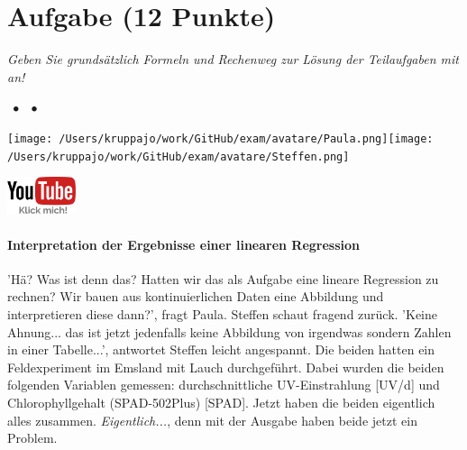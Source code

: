 \documentclass[a4paper, 9pt]{scrartcl}\usepackage[]{graphicx}\usepackage[]{xcolor}
\begin{document}
\section{Aufgabe \hfill (12 Punkte)}

\textit{Geben Sie grundsätzlich Formeln und Rechenweg zur Lösung der Teilaufgaben mit an!} \\[1Ex]
 

 
\ifcollection
\begin{flushright}
\tiny\vspace{-3Ex}
\textbf{\examinhaltstart}
\exammodulestat $\;\bullet$
\exammodulestatbbv $\;\bullet$
\exammodulestatversuch 
\vspace{-4Ex}
\end{flushright}
\begin{minipage}[t]{0.5\textwidth}
\texttt{[image: /Users/kruppajo/work/GitHub/exam/avatare/Paula.png]}\hspace{-4mm}\texttt{[image: /Users/kruppajo/work/GitHub/exam/avatare/Steffen.png]}
\end{minipage}
\begin{minipage}[t]{0.5\textwidth}
\hfill
\href{https://youtu.be/lJp8rFmMnrs}{\includegraphics[width = 2cm]{img/youtube}}
\end{minipage}
\fi



\ifcollection
\paragraph{Interpretation der Ergebnisse einer linearen Regression}
\fi

'Hä? Was ist denn das? Hatten wir das als Aufgabe eine lineare Regression zu rechnen? Wir bauen aus kontinuierlichen Daten eine Abbildung und interpretieren diese dann?', fragt Paula. Steffen schaut fragend zurück. 'Keine Ahnung... das ist jetzt jedenfalls keine Abbildung von irgendwas sondern Zahlen in einer Tabelle...', antwortet Steffen leicht angespannt. Die beiden hatten ein Feldexperiment im Emsland mit Lauch durchgeführt. Dabei wurden die beiden folgenden Variablen gemessen: durchschnittliche UV-Einstrahlung [UV/d] und Chlorophyllgehalt (SPAD-502Plus) [SPAD]. Jetzt haben die beiden eigentlich alles zusammen. \textit{Eigentlich...}, denn mit der \Rlogo Ausgabe haben beide jetzt ein Problem.
\end{document}
